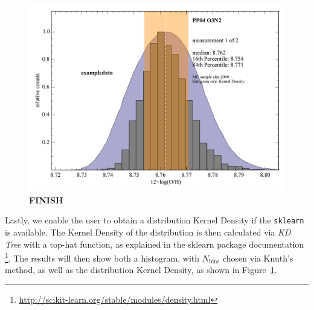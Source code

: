 \documentclass{emulateapj}
\begin{document}
\begin{figure}[ht!]
  \includegraphics[width=0.95\columnwidth]{exampledata_n2000_PP04_O3N2_1KDE.pdf}
   \caption{\textbf{FINISH}}
\label{fig:KDE}
\end{figure}
Lastly, we enable the user to obtain a distribution Kernel Density if the \verb=sklearn= is available. The Kernel Density of the distribution is then calculated via  \emph{KD Tree} with a top-hat function, as explained in the sklearn package documentation \footnote{\url{http://scikit-learn.org/stable/modules/density.html}}. The results will then show both a histogram, with $N_\mathrm{bins}$ chosen via Knuth's method, as well as the distribution Kernel Density, as shown in Figure~\ref{fig:KDE}.
\end{document}
